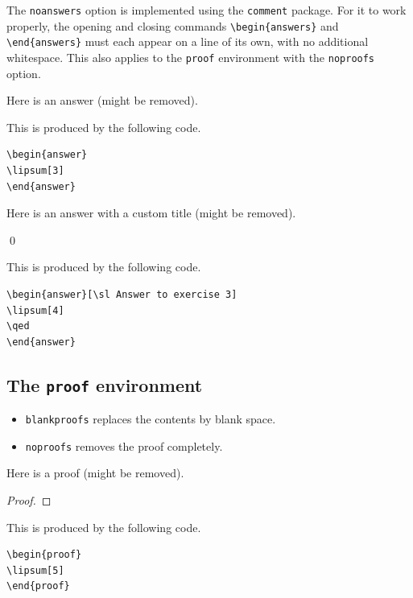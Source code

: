 \documentclass{article}
\theoremstyle{definition}
\begin{document}
The {\tt noanswers} option is implemented using the {\tt comment} package. For it to work properly, the opening and closing commands \verb+\begin{answers}+ and \verb+\end{answers}+ must each appear on a line of its own, with no additional whitespace. This also applies to the \verb+proof+ environment with the {\tt noproofs} option.

Here is an answer (might be removed).
\begin{answer}
\lipsum[3]
\end{answer}

This is produced by the following code.
\begin{Verbatim}[frame=single]
\begin{answer}
\lipsum[3]
\end{answer}
\end{Verbatim}

Here is an answer with a custom title (might be removed).
\begin{answer}
\lipsum[4]
\qed
\end{answer}

This is produced by the following code.
\begin{Verbatim}[frame=single]
\begin{answer}[\sl Answer to exercise 3]
\lipsum[4]
\qed
\end{answer}
\end{Verbatim}

\subsection{The {\tt proof} environment}
\begin{itemize}
\item {\tt blankproofs} replaces the contents by blank space. 
\item {\tt noproofs} removes the proof completely.
\end{itemize}

Here is a proof (might be removed).
\begin{proof}
\lipsum[5]
\end{proof}

This is produced by the following code.
\begin{Verbatim}[frame=single]
\begin{proof}
\lipsum[5]
\end{proof}
\end{Verbatim}
\end{document}
